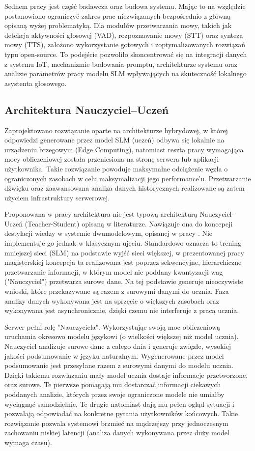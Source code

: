 Sednem pracy jest część badawcza oraz budowa systemu. Mając to na względzie postanowiono ograniczyć zakres prac niezwiązanych bezpośrednio z główną opisaną wyżej problematyką. Dla modułów przetwarzania mowy, takich jak detekcja aktywności głosowej (VAD), rozpoznawanie mowy (STT) oraz synteza mowy (TTS), założono wykorzystanie gotowych i zoptymalizowanych rozwiązań typu open-source. To podejście pozwoliło skoncentrować się na integracji danych z systemu IoT, mechanizmie budowania promptu, architekturze systemu oraz analizie parametrów pracy modelu SLM wpływających na skuteczność lokalnego asystenta głosowego.

\subsection{Architektura Nauczyciel–Uczeń}\label{subsec:teacher_student}

Zaprojektowano rozwiązanie oparte na architekturze hybrydowej, w której odpowiedzi generowane przez model SLM (uczeń) odbywa się lokalnie na urządzeniu brzegowym (Edge Computing), natomiast reszta pracy wymagająca mocy obliczeniowej została przeniesiona na stronę serwera lub aplikacji użytkownika. Takie rozwiązanie powoduje maksymalne odciążenie węzła o ograniczonych zasobach w celu maksymalizacji jego performance'u. Przetwarzanie dźwięku oraz zaawansowana analiza danych historycznych realizowane są zatem użyciem infrastruktury serwerowej. 

Proponowana w pracy architektura nie jest typową architekturą Nauczyciel-Uczeń (Teacher-Student) opisaną w literaturze. Nawiązuje ona do koncepcji destylacji wiedzy w systemie dwumodelowym, opisanej w pracy \cite{Hinton2015}. Nie implementuje go jednak w klasycznym ujęciu. Standardowo oznacza to trening mniejszej sieci (SLM) na podstawie wyjść sieci większej, w prezentowanej pracy magisterskiej koncepcja ta realizowana jest poprzez sekwencyjne, hierarchiczne przetwarzanie informacji, w którym model nie poddany kwantyzacji wag ("Nauczyciel") przetwarza surowe dane. Na tej podstawie generuje nieoczywiste wnioski, które przekazywane są razem z surowymi danymi do ucznia. Faza analizy danych wykonywana jest na sprzęcie o większych zasobach oraz wykonywana jest asynchronicznie, dzięki czemu nie interferuje z pracą ucznia.

Serwer pełni rolę "Nauczyciela". Wykorzystując swoją moc obliczeniową uruchamia okresowo modelu językowi (o wielkości większej niż model ucznia). Nauczyciel analizuje surowe dane z całego dnia i generuje zwięzłe, wysokiej jakości podsumowanie w języku naturalnym. Wygenerowane przez model podsumowanie jest przesyłane razem z surowymi danymi do modelu ucznia. Dzięki takiemu rozwiązaniu mały model ucznia dostaje informacje przetworzone, oraz surowe. Te pierwsze pomagają mu dostarczać informacji ciekawych poddanych analizie, których przez swoje ograniczone modele nie umiałby wyciągnąć samodzielnie. Te drugie natomiast dają mu pełen ogląd sytuacji i pozwalają odpowiadać na konkretne pytania użytkowników końcowych. Takie rozwiązanie pozwala systemowi brzmieć na mądrzejszy przy jednoczesnym zachowaniu niskiej latencji (analiza danych wykonywana przez duży model wymaga czasu).


